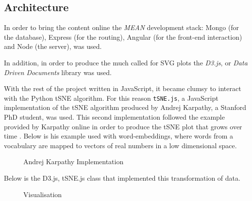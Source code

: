 \documentclass[a4paper,11pt,titlepage]{article}
\begin{document}
	\subsection{Architecture}
	In order to bring the content online the \textit{MEAN} development stack: Mongo (for the database), Express (for the routing), Angular (for the front-end interaction) and Node (the server), was used. 
	\par 
	In addition, in order to produce the much called for SVG plots the \textit{D3.js}, or \textit{Data Driven Documents} library was used. 
	\par 
	With the rest of the project written in JavaScript, it became clumsy to interact with the Python tSNE algorithm. For this reason \texttt{tSNE.js}, a JavaScript implementation of the tSNE algorithm produced by Andrej Karpathy, a Stanford PhD student, was used. This second implementation followed the example provided by Karpathy online in order to produce the tSNE plot that grows over time \cite{karpathy}. Below is his example used with word-embeddings, where words from a vocabulary are mapped to vectors of real numbers in a low dimensional space.
		
	\begin{figure}[H]
    			\caption{Andrej Karpathy Implementation}%
	\end{figure}		

	Below is the D3.js, tSNE.js class that implemented this transformation of data. 
	
	\begin{figure}[H]
    			\caption{Visualisation}%
	\end{figure}
			
\end{document}
